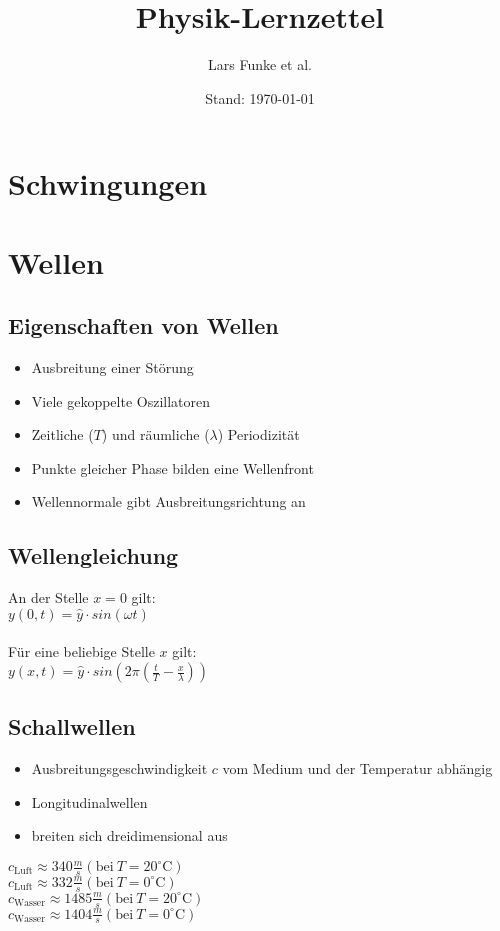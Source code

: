 \documentclass[12pt,a4paper,titlepage]{article}
\title{Physik-Lernzettel}
\author{Lars Funke et al.}
\date{Stand: \today}
\begin{document}
	\maketitle
	\tableofcontents
	\pagebreak
	\section{Schwingungen}
	\section{Wellen}
		\subsection{Eigenschaften von Wellen}
			\begin{itemize}
				\item Ausbreitung einer Störung
				\item Viele gekoppelte Oszillatoren
				\item Zeitliche ($T$) und räumliche ($\lambda$) Periodizität
				\item Punkte gleicher Phase bilden eine Wellenfront
				\item Wellennormale gibt Ausbreitungsrichtung an
			\end{itemize}
		\subsection{Wellengleichung}
			An der Stelle $x = 0$ gilt:\\
			$ y(0,t) = \hat{y} \cdot sin(\omega t)$ \\\\
			Für eine beliebige Stelle $x$ gilt:\\
			$ y(x,t) = \hat{y} \cdot sin(2 \pi (\frac{t}{T} - \frac{x}{\lambda} )) $
		\subsection{Schallwellen}
			\begin{itemize}
				\item Ausbreitungsgeschwindigkeit $c$ vom Medium und der Temperatur abhängig
				\item Longitudinalwellen
				\item breiten sich dreidimensional aus
			\end{itemize}
			$c_{\mathrm{Luft}} \approx 340 \frac{m}{s} (\mathrm{bei}\ T = 20^{\circ}\mathrm{C})$\\
			$c_{\mathrm{Luft}} \approx 332 \frac{m}{s} (\mathrm{bei}\ T = 0^{\circ}\mathrm{C})$\\
			$c_{\mathrm{Wasser}} \approx 1485 \frac{m}{s} (\mathrm{bei}\ T = 20^{\circ}\mathrm{C})$\\
			$c_{\mathrm{Wasser}} \approx 1404 \frac{m}{s} (\mathrm{bei}\ T = 0^{\circ}\mathrm{C})$
\end{document}
